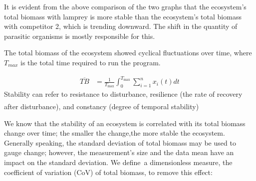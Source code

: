 \documentclass[12pt]{article}  %
\newcommand{\upcite}[1]{\textsuperscript{\textsuperscript{\cite{#1}}}}
\begin{document}
It is evident from the above comparison of the two graphs that the ecosystem's total biomass with lamprey is more stable than the ecosystem's total biomass with competitor 2, which is trending downward. The shift in the quantity of parasitic organisms is mostly responsible for this.
\par
The total biomass of the ecosystem showed cyclical fluctuations over time, where $T_{max}$ is the total time required to run the program.\par
\begin{equation}
	\begin{aligned}
		\overline {TB} & =  \frac {1}{T_ {\max }} \int _ {0}^ {T_ {\max }} \sum _ {i=1}^ {n}  x_ {i}  (t)dt
	\end{aligned}
\end{equation}
Stability can refer to resistance to disturbance, resilience (the rate of recovery after disturbance), and constancy (degree of temporal stability)\upcite{4}

\par
We know that the stability of an ecosystem is correlated with its total biomass change over time; the smaller the change,the more stable the ecosystem. Generally speaking, the standard deviation of total biomass may be used to gauge change; however, the measurement's size and the data mean have an impact on the standard deviation. We define a dimensionless measure, the coefficient of variation (CoV) of total biomass, to remove this effect:\par
\end{document}
